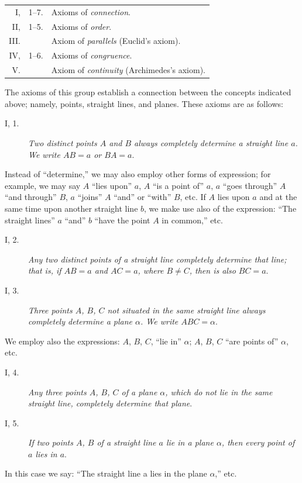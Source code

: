 \documentclass[11pt,oneside]{book}
\begin{document}
\begin{tabular}{rcl}
I,&1--7.&Axioms of \emph{connection}.\\
II,&1--5.&Axioms of \emph{order}.\\
III.&&Axiom of \emph{parallels} (Euclid's axiom).\\
IV,&1--6.&Axioms of \emph{congruence}.\\
V.&&Axiom of \emph{continuity} (Archimedes's axiom).\\
\end{tabular}

\label{p2}

The axioms of this group establish a connection
between the concepts indicated above; namely, points,
straight lines, and planes. These axioms are as follows:

\begin{description}
\item[I, 1.] \emph{Two distinct points $A$ and $B$ always completely
determine a straight line $a$. We write $AB = a$
or $BA = a$}.
\end{description}

Instead of ``determine,'' we may also employ other
forms of expression; for example, we may say $A$
``lies upon'' $a$, $A$ ``is a point of'' $a$, $a$ ``goes through''
$A$ ``and through'' $B$, $a$ ``joins'' $A$ ``and'' or ``with''
$B$, etc. If $A$ lies upon $a$ and at the same time upon
another straight line $b$, we make use also of the expression:
``The straight lines'' $a$ ``and'' $b$ ``have the
point $A$ in common,'' etc.

\begin{description}
\item[I, 2.] \emph{Any two distinct points of a straight line completely
determine that line; that is, if $AB = a$ and
$AC=a$, where $B \neq C$, then is also $BC=a$}.
\newpage
\item[I, 3.] \emph{Three points $A$, $B$, $C$ not situated in the same
straight line always completely determine a plane
$\alpha$. We write $ABC=\alpha$}.
\end{description}

We employ also the expressions: $A$, $B$, $C$, ``lie
in'' $\alpha$; $A$, $B$, $C$ ``are points of'' $\alpha$, etc.

\begin{description}
\item[I, 4.] \emph{Any three points $A$, $B$, $C$ of a plane $\alpha$, which
do not lie in the same straight line, completely determine
that plane}.

\item[I, 5.] \emph{If two points $A$, $B$ of a straight line $a$ lie in
a plane $\alpha$, then every point of $a$ lies in $a$}.
\end{description}
In this case we say: ``The straight line a lies in
the plane $\alpha$,'' etc.
\end{document}
